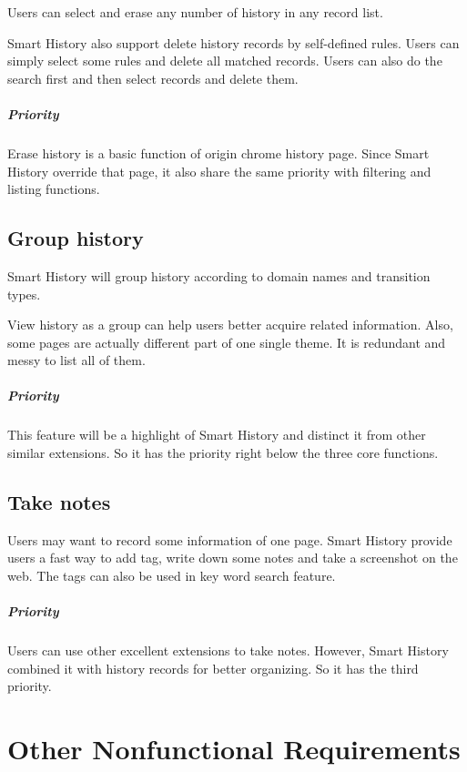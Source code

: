 \documentclass[a5paper]{scrreprt}
\begin{document}
Users can select and erase any number of history in any record list.

Smart History also support delete history records by self-defined rules. Users can 
simply select some rules and delete all matched records. Users can also do the 
search first and then select records and delete them.

\paragraph{Priority} Erase history is a basic function of origin chrome history 
page. Since Smart History override that page, it also share the same priority 
with filtering and listing functions.

\section{Group history}

Smart History will group history according to domain names and transition types.

View history as a group can help users better acquire related information. Also, 
some pages are actually different part of one single theme. It is redundant and 
messy to list all of them.

\paragraph{Priority} This feature will be a highlight of Smart History and distinct 
it from other similar extensions. So it has the priority right below the three core 
functions.

\section{Take notes}

Users may want to record some information of one page. Smart History provide users 
a fast way to add tag, write down some notes and take a screenshot on the web. The 
tags can also be used in key word search feature.

\paragraph{Priority} Users can use other excellent extensions to take notes. However, 
Smart History combined it with history records for better organizing. So it has the 
third priority.


\chapter{Other Nonfunctional Requirements}
\end{document}
